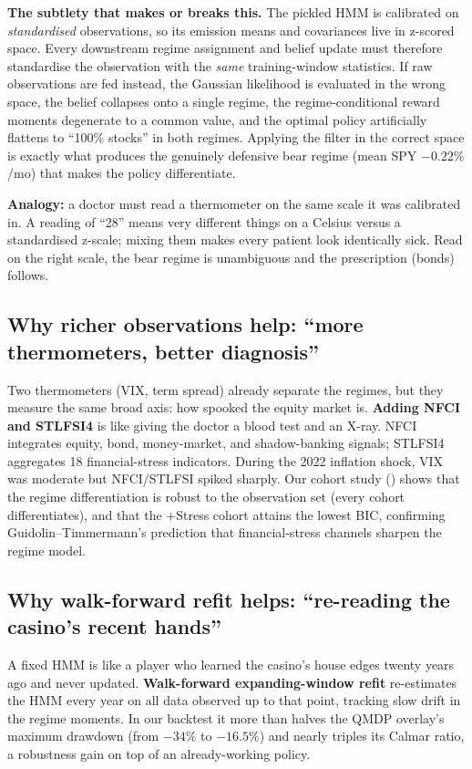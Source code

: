 \documentclass[11pt]{article}
\theoremstyle{plain1}
\theoremstyle{definition1}
\newcommand{\1}{\mathbf{1}}
\begin{document}
\textbf{The subtlety that makes or breaks this.} The pickled HMM is calibrated on \emph{standardised} observations, so its emission means and covariances live in z-scored space. Every downstream regime assignment and belief update must therefore standardise the observation with the \emph{same} training-window statistics. If raw observations are fed instead, the Gaussian likelihood is evaluated in the wrong space, the belief collapses onto a single regime, the regime-conditional reward moments degenerate to a common value, and the optimal policy artificially flattens to ``100\% stocks'' in both regimes. Applying the filter in the correct space is exactly what produces the genuinely defensive bear regime (mean SPY $-0.22\%$/mo) that makes the policy differentiate.

\textbf{Analogy:} a doctor must read a thermometer on the same scale it was calibrated in. A reading of ``28'' means very different things on a Celsius versus a standardised z-scale; mixing them makes every patient look identically sick. Read on the right scale, the bear regime is unambiguous and the prescription (bonds) follows.

\subsection{Why richer observations help: ``more thermometers, better diagnosis''}

Two thermometers (VIX, term spread) already separate the regimes, but they measure the same broad axis: how spooked the equity market is. \textbf{Adding NFCI and STLFSI4} is like giving the doctor a blood test and an X-ray. NFCI integrates equity, bond, money-market, and shadow-banking signals; STLFSI4 aggregates 18 financial-stress indicators. During the 2022 inflation shock, VIX was moderate but NFCI/STLFSI spiked sharply. Our cohort study () shows that the regime differentiation is robust to the observation set (every cohort differentiates), and that the +Stress cohort attains the lowest BIC, confirming Guidolin--Timmermann's prediction that financial-stress channels sharpen the regime model.

\subsection{Why walk-forward refit helps: ``re-reading the casino's recent hands''}

A fixed HMM is like a player who learned the casino's house edges twenty years ago and never updated. \textbf{Walk-forward expanding-window refit} re-estimates the HMM every year on all data observed up to that point, tracking slow drift in the regime moments. In our backtest it more than halves the QMDP overlay's maximum drawdown (from $-34\%$ to $-16.5\%$) and nearly triples its Calmar ratio, a robustness gain on top of an already-working policy.
\end{document}
